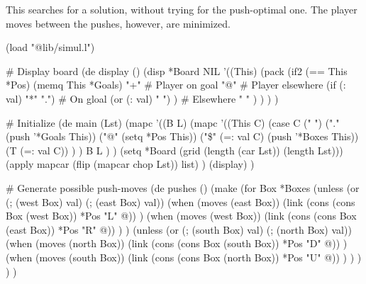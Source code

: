 \begin{wideverbatim}

This searches for a solution, without trying for the push-optimal one. The
player moves between the pushes, however, are minimized.

(load "@lib/simul.l")

# Display board
(de display ()
   (disp *Board NIL
      '((This)
         (pack
            (if2 (== This *Pos) (memq This *Goals)
               "+"                   # Player on goal
               "@"                   # Player elsewhere
               (if (: val) "*" ".")  # On gloal
               (or (: val) " ") )    # Elsewhere
            " " ) ) ) )

# Initialize
(de main (Lst)
   (mapc
      '((B L)
         (mapc
            '((This C)
               (case C
                  (" ")
                  ("." (push '*Goals This))
                  ("@" (setq *Pos This))
                  ("\$" (=: val C) (push '*Boxes This))
                  (T (=: val C)) ) )
               B L ) )
      (setq *Board (grid (length (car Lst)) (length Lst)))
      (apply mapcar (flip (mapcar chop Lst)) list) )
   (display) )

# Generate possible push-moves
(de pushes ()
   (make
      (for Box *Boxes
         (unless (or (; (west Box) val) (; (east Box) val))
            (when (moves (east Box))
               (link (cons (cons Box (west Box)) *Pos "L" @)) )
            (when (moves (west Box))
               (link (cons (cons Box (east Box)) *Pos "R" @)) ) )
         (unless (or (; (south Box) val) (; (north Box) val))
            (when (moves (north Box))
               (link (cons (cons Box (south Box)) *Pos "D" @)) )
            (when (moves (south Box))
               (link (cons (cons Box (north Box)) *Pos "U" @)) ) ) ) ) )

\end{wideverbatim}

